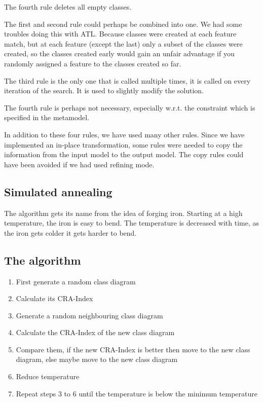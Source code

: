 \documentclass[a4paper]{article}
\begin{document}
The fourth rule deletes all empty classes.

The first and second rule could perhaps be combined into one.
We had some troubles doing this with ATL.
Because classes were created at each feature match, but at each feature (except the last) only a subset of the classes were created, so the classes created early would gain an unfair advantage if you randomly assigned a feature to the classes created so far.

The third rule is the only one that is called multiple times, it is called on every iteration of the search.
It is used to slightly modify the solution.

The fourth rule is perhaps not necessary, especially w.r.t. the constraint which is specified in the metamodel.

In addition to these four rules, we have used many other rules.
Since we have implemented an in-place transformation, some rules were needed to copy the information from the input model to the output model.
The copy rules could have been avoided if we had used refining mode.

\subsection{Simulated annealing}

The algorithm gets its name from the idea of forging iron.
Starting at a high temperature, the iron is easy to bend.
The temperature is decreased with time, as the iron gets colder it gets harder to bend.


\subsection{The algorithm}

\begin{enumerate}
  \item First generate a random class diagram
  \item Calculate its CRA-Index
  \item Generate a random neighbouring class diagram
  \item Calculate the CRA-Index of the new class diagram
  \item Compare them, if the new CRA-Index is better then move to the new
class diagram, else maybe move to the new class diagram
  \item Reduce temperature
  \item Repeat steps 3 to 6 until the temperature is below the minimum
temperature
\end{enumerate}
\end{document}
